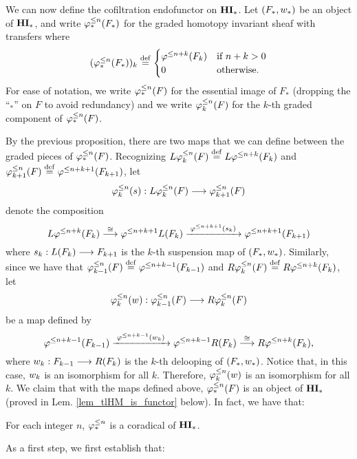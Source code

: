 We can now define the cofiltration endofunctor on $\HM$. Let
$(F_*, \deloop_*)$ be an object of $\HM$, and write $\tlHM{n}(F_*)$ 
for the graded homotopy invariant sheaf with transfers where
\[
(\tlHM{n}(F_*))_k \defeq
\begin{cases}
   \tlHI{n + k}(F_k) & \textrm{if } n + k > 0 \\
   0                 & \textrm{otherwise}.
\end{cases}
\]
For ease of notation, we write $\tlHM{n}(F)$ for the essential 
image of $F_*$ (dropping the ``$_*$'' on $F$ to avoid 
redundancy) and we write $\tlHM[k]{n}(F)$ for the $k$-th graded 
component of $\tlHM{n}(F)$.

By the previous proposition, there are two maps that we can
define between the graded pieces of $\tlHM{n}(F)$. Recognizing
$L\tlHM[k]{n}(F) \defeq L \tlHI{n + k}(F_k)$ and 
$\tlHM[k + 1]{n}(F) \defeq \tlHI{n + k + 1}(F_{k + 1})$, let
\[
\suspTL[k]{n} : L\tlHM[k]{n}(F) \to \tlHM[k + 1]{n}(F) 
\]
denote the composition
\begin{equation}\label{eq_susp_def}
L \tlHI{n + k}(F_k) \stackrel{\cong}{\to} 
   \tlHI{n + k + 1}L(F_k) 
   \xrightarrow{\;\tlHI{n + k + 1}(\susp_k)\;} 
   \tlHI{n + k + 1}(F_{k + 1})
\end{equation}
where $\susp_k: L(F_k) \to F_{k + 1}$ is the $k$-th suspension 
map of $(F_*, \deloop_*)$. Similarly, since we have that
$\tlHM[k - 1]{n}(F) \defeq \tlHI{n + k - 1}(F_{k - 1})$ and
$R \tlHM[k]{n}(F) \defeq R \tlHI{n + k}(F_{k})$, let
\[
\deloopTL[k]{n} : \tlHM[k - 1]{n}(F) \to R \tlHM[k]{n}(F) 
\]
be a map defined by
\begin{equation}\label{eq_deloop_def}
\tlHI{n + k - 1}(F_{k - 1})
   \xrightarrow{\;\tlHI{n + k - 1}(\deloop_k)\;} 
   \tlHI{n + k - 1} R(F_k) \stackrel{\cong}{\to} 
   R \tlHI{n + k}(F_k),
\end{equation}
where $\deloop_k: F_{k - 1} \to R(F_k)$ is the $k$-th delooping
of $(F_*, \deloop_*)$. Notice that, in this case, $\deloop_k$ is
an isomorphism for all $k$. Therefore, $\deloopTL[k]{n}$ is an 
isomorphism for all $k$. We claim that with the maps defined above,
$\tlHM{n}(F)$ is an object of $\HM$ (proved in Lem. 
\ref{lem_tlHM_is_functor} below). In fact, we have that:

\begin{thm}\label{thm_tlHM_corad}
For each integer $n$, $\tlHM{n}$ is a coradical of $\HM$.
\end{thm}

As a first step, we first establish that:

